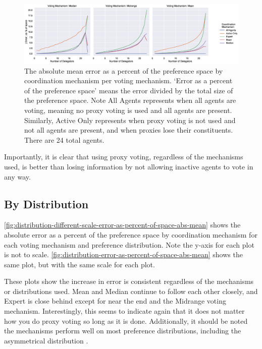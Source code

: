 \begin{landscape}
    \begin{figure}[p]
        \centering
        \includegraphics[scale=0.55]
        {content/chapter2/figures/vm_col_cm_hue_error_as_percent_of_space_abs_mean}
        \caption{
            The absolute mean error as a percent of the preference space by
            coordination mechanism per voting mechanism.
            `Error as a percent of the preference space' means the error divided by
            the total size of the preference space.
            Note All Agents represents when all agents are voting, meaning no proxy
            voting is used and all agents are present.
            Similarly, Active Only represents when proxy voting is not used and not
            all agents are present, and when proxies lose their constituents.
            \\
            There are 24 total agents.
        }
        \label{fig:vm-col-cm-hue-error-as-percent-of-space-abs-mean}
    \end{figure}
\end{landscape}

Importantly, it is clear that using proxy voting, regardless of the mechanisms used,
is better than losing information by not allowing inactive agents to vote in any way.

\subsection{By Distribution}\label{subsec:results-distribution}
\autoref{fig:distribution-different-scale-error-as-percent-of-space-abs-mean} shows
the absolute error as a percent of the preference space by coordination mechanism for
each voting mechanism and preference distribution.
Note the y-axis for each plot is not to scale.
\autoref{fig:distribution-error-as-percent-of-space-abs-mean} shows the same plot,
but with the same scale for each plot.

These plots show the increase in error is consistent regardless of the mechanisms or
distributions used.
Mean and Median continue to follow each other closely, and Expert is close behind
except for near the end and the Midrange voting mechanism.
Interestingly, this seems to indicate again that it does not matter how you do proxy
voting so long as it is done.
Additionally, it should be noted the mechanisms perform well on most preference
distributions, including the asymmetrical distribution .


